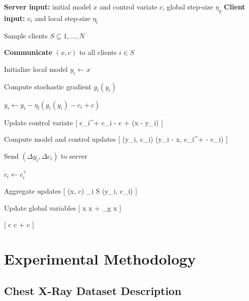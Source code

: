 \documentclass[12pt]{book}
\begin{document}
\begin{algorithm}[H]
\caption{SCAFFOLD: Stochastic Controlled Averaging for Federated Learning}
\label{alg:scaffold}
\begin{algorithmic}[1]

\STATE \textbf{Server input:} initial model $x$ and control variate $c$, global step-size $\eta_g$
\STATE \textbf{Client input:} $c_i$ and local step-size $\eta_l$


\STATE Sample clients $S \subseteq {1,\dots,N}$

\STATE \textbf{Communicate} $(x, c)$ to all clients $i \in S$


\STATE Initialize local model $y_i \leftarrow x$


\STATE Compute stochastic gradient $g_i(y_i)$

\STATE $y_i \leftarrow y_i - \eta_l (g_i(y_i) - c_i + c)$

\ENDFOR

\STATE Update control variate
[
c_i^{+} \leftarrow c_i - c + (x - y_i)
]

\STATE Compute model and control updates
[
(\Delta y_i, \Delta c_i) \leftarrow (y_i - x, c_i^{+} - c_i)
]

\STATE Send $(\Delta y_i, \Delta c_i)$ to server

\STATE $c_i \leftarrow c_i^{+}$

\ENDFOR

\STATE Aggregate updates
[
(\Delta x, \Delta c) \leftarrow
{} \sum_{i \in S} (\Delta y_i, \Delta c_i)
]

\STATE Update global variables
[
x \leftarrow x + \eta_g \Delta x
]

[
c \leftarrow c +  \Delta c
]

\ENDFOR

\end{algorithmic}
\end{algorithm}

\chapter{Experimental Methodology}

\section{Chest X-Ray Dataset Description}
\end{document}
